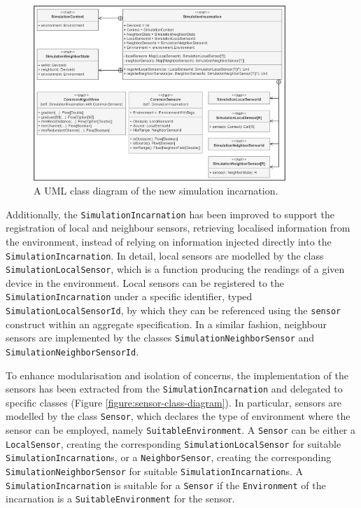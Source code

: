 \begin{figure}[!ht]
  \centering
  \includegraphics[width=0.85\textwidth]{resources/figures/simulation-incarnation-class-diagram.png}
  \caption{A UML class diagram of the new simulation incarnation.}
  \label{figure:simulation-incarnation-class-diagram}
\end{figure}

Additionally, the \texttt{SimulationIncarnation} has been improved to support
the registration of local and neighbour sensors, retrieving localised
information from the environment, instead of relying on information injected
directly into the \texttt{Simu\-lationIncarnation}. In detail, local sensors
are modelled by the class \texttt{Simula\-tionLocalSensor}, which is a function
producing the readings of a given device in the environment. Local sensors can
be registered to the \texttt{SimulationIncar\-nation} under a specific
identifier, typed \texttt{SimulationLocalSensorId}, by which they can be
referenced using the \texttt{sensor} construct within an aggregate
specification. In a similar fashion, neighbour sensors are implemented by the
classes \texttt{SimulationNeighbor\-Sensor} and
\texttt{Simulation\-NeighborSensorId}.

To enhance modularisation and isolation of concerns, the implementation of the
sensors has been extracted from the \texttt{SimulationIncarnation} and
delegated to specific classes (Figure \ref{figure:sensor-class-diagram}). In
particular, sensors are modelled by the class \texttt{Sensor}, which declares
the type of environment where the sensor can be employed, namely
\texttt{SuitableEnviron\-ment}. A \texttt{Sensor} can be either a
\texttt{LocalSensor}, creating the corresponding
\texttt{Simula\-tion\-LocalSensor} for suitable
\texttt{SimulationIncarnation}s, or a \texttt{NeighborSensor}, creating the
corresponding \texttt{SimulationNeighborSensor} for suitable
\texttt{Simulation\-Incarnation}s. A \texttt{SimulationIncarnation} is suitable
for a \texttt{Sensor} if the \texttt{Environ\-ment} of the incarnation is a
\texttt{SuitableEnvironment} for the sensor.

